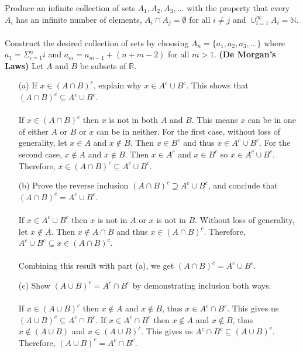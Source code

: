 \documentclass[11pt]{article}
\def\N{{\mathbb{N}}}
\def\R{{\mathbb{R}}}
\newenvironment{exer}[1]
    {\renewcommand\theinnercustomexer{#1}\innercustomexer\upshape}
    {\endinnercustomexer}
\begin{document}
\begin{exer}{1.2.4}
    Produce an infinite collection of sets $A_1,A_2,A_3,...$ with the property that every $A_i$ has an infinite number of elements, $A_i\cap A_j=\emptyset$ for all $i\neq j$ and $\cup_{i=1}^{\infty}A_i=\N$. \\ \\
    Construct the desired collection of sets by choosing $A_n=\{a_1, a_2, a_3,...\}$ where $a_1=\Sigma_{i=1}^{n}i$ and $a_m=a_{m-1}+(n+m-2)$ for all $m>1$.
\end{exer}
\begin{exer}{1.2.5} \textbf{(De Morgan's Laws)}
    Let $A$ and $B$ be subsets of $\R$.
    \begin{enumerate}
        \item[(a)] 
            If $x\in(A\cap B)^c$, explain why $x\in A^c\cup B^c$. This shows that $(A\cap B)^c\subseteq A^c\cup B^c$. \\ \\
            If $x\in(A\cap B)^c$ then $x$ is not in both $A$ and $B$. This means $x$ can be in one of either $A$ or $B$ or $x$ can be in neither. For the first case, without loss of generality, let $x\in A$ and $x\notin B$. Then $x\in B^c$ and thus $x\in A^c\cup B^c$. For the second case, $x\notin A$ and $x\notin B$. Then $x\in A^c$ and $x\in B^c$ so $x\in A^c\cup B^c$. Therefore, $x\in (A\cap B)^c\subseteq A^c\cup B^c$.
        \item[(b)]
            Prove the reverse inclusion $(A\cap B)^c\supseteq A^c\cup B^c$, and conclude that $(A\cap B)^c=A^c\cup B^c$. \\ \\
            If $x\in A^c\cup B^c$ then $x$ is not in $A$ or $x$ is not in $B$. Without loss of generality, let $x\notin A$. Then $x\notin A\cap B$ and thus $x\in(A\cap B)^c$. Therefore, $A^c\cup B^c\subseteq x\in (A\cap B)^c$. \\ \\
            Combining this result with part (a), we get $(A\cap B)^c=A^c\cup B^c$.
        \item[(c)]
            Show $(A\cup B)^c=A^c\cap B^c$ by demonstrating inclusion both ways. \\ \\
            If $x\in (A\cup B)^c$ then $x\notin A$ and $x\notin B$, thus $x\in A^c\cap B^c$. This gives us $(A\cup B)^c\subseteq A^c\cap B^c$. If $x\in A^c\cap B^c$ then $x\notin A$ and $x\notin B$, thus $x\notin(A\cup B)$ and $x\in(A\cup B)^c$. This gives us $A^c\cap B^c\subseteq(A\cup B)^c$. Therefore, $(A\cup B)^c=A^c\cap B^c$.
    \end{enumerate}
    
\end{exer}
\end{document}
